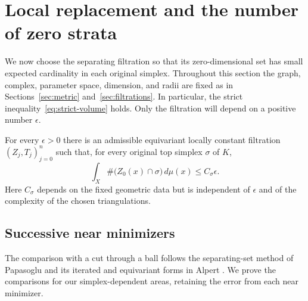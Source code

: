 \section{Local replacement and the number of zero strata}
\label{sec:surgery}

We now choose the separating filtration so that its zero-dimensional set
has small expected cardinality in each original simplex.  Throughout this
section the graph, complex, parameter space, dimension, and radii are fixed
as in Sections~\ref{sec:metric} and~\ref{sec:filtrations}.  In particular,
the strict inequality~\eqref{eq:strict-volume} holds.  Only the filtration
will depend on a positive number $\epsilon$.

\begin{proposition}\label{prop:zero-strata}
For every $\epsilon>0$ there is an admissible equivariant locally constant
filtration $(Z_j,T_j)_{j=0}^n$ such that, for every original top simplex
$\sigma$ of $K$,
\begin{equation}\label{eq:zero-strata}
 \int_X\#\bigl(Z_0(x)\cap\sigma\bigr)\,d\mu(x)
 \le C_\sigma\epsilon.
\end{equation}
Here $C_\sigma$ depends on the fixed geometric data but is independent of
$\epsilon$ and of the complexity of the chosen triangulations.
\end{proposition}

\subsection{Successive near minimizers}

The comparison with a cut through a ball follows the separating-set
method of Papasoglu \cite[Section 2, especially Lemma 2.5]{Papasoglu2020}
and its iterated and equivariant forms in Alpert
\cite[Lemmas 6--7 and 11--12]{Alpert2025}. We prove the comparisons for our
simplex-dependent areas, retaining the error from each near minimizer.

